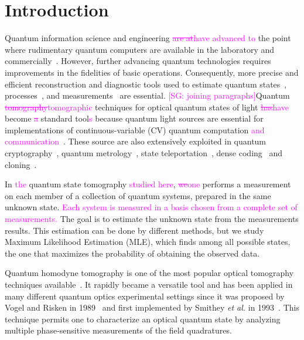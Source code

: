 \documentclass[
reprint,
superscriptaddress,
showpacs,
amsmath,
amssymb,
aps,
pra,
longbibliography
]{revtex4-1}
\providecommand{\aucmnt}[1]{#1}
\providecommand{\editcolor}[2]{\textcolor{#1}{#2}}
\providecommand{\aucmnt}[1]{}
\providecommand{\editcolor}[2]{#2}
\newcommand{\SG}[1]{\editcolor{magenta}{#1}}
\newcommand{\SGs}[1]{\aucmnt{\editcolor{magenta}{\sout{#1}}}}
\newcommand{\SGc}[1]{\aucmnt{\editcolor{magenta}{[SG: #1]}}}
\begin{document}

\section{Introduction}
\label{intro}
Quantum information science and engineering \SGs{are at}\SG{have
  advanced to} the point where rudimentary quantum computers are
available in the laboratory and commercially~\cite{kandala2017,
  Linke2017, Monk2017, Denchev2016}.  However, further advancing
quantum technologies requires improvements in the fidelities of basic
operations.  Consequently, more precise and efficient reconstruction
and diagnostic tools used to estimate quantum states~\cite{Vogel1989,
  Smithey1993, Dunn1995, Banaszek1999, Banaszek2000, White2002,
  Ourjoumtsev2007, Neergaard2006}, processes~\cite{Chuang1997,
  Poyatos1997, Altepeter2003, Dariano1998, Nielsen1998, Mitchell2003,
  Obrien2004,Kupchak2015}, and measurements~\cite{Luis1999,
  Fiurasek2001, Dariano2004, Lundeen2009} are essential.  \SGc{joining
  paragraphs}Quantum \SGs{tomography}\SG{tomographic} techniques for
optical quantum states of light \SGs{has}\SG{have} become \SGs{a}
standard tool\SG{s} because quantum light sources are essential for
implementations of continuous-variable (CV) quantum computation
\SG{and communication}~\cite{Lloyd1999, Gottesman2001, Bartlett2002,
  Jeong2002, Ralph2003}.  These source are also extensively exploited
in quantum cryptography~\cite{Ralph1999, Hillery2000, Silberhorn2002,
  Pirandola2008, Luiz2017}, quantum metrology~\cite{Eberle2010,
  Demkowicz2013}, state teleportation~\cite{Vaidman1994,
  Braunstein1998, He2015}, dense coding~\cite{Braunstein2000, Lee2014}
and cloning~\cite{Cerf2000, Braunstein2001}.

In \SG{the} quantum state tomography \SG{studied here},
\SGs{we}\SG{one} performs a measurement on each member of a collection
of quantum systems, prepared in the same unknown state. \SG{Each
  system is measured in a basis chosen from a complete set of
  measurements.}  The goal is to estimate the unknown state from the
measurements results.  This estimation can be done by different
methods, but we study Maximum Likelihood Estimation (MLE), which finds
among all possible states, the one that maximizes the probability of
obtaining the observed data.

Quantum homodyne tomography is one of the most popular optical
tomography techniques available~\cite{Lvovsky2004}. It rapidly became
a versatile tool and has been applied in many different quantum optics
experimental settings since it was proposed by Vogel and Risken in
1989~\cite{Vogel1989} and first implemented by Smithey \textit{et al.}
in 1993~\cite{Smithey1993}. This technique permits one to characterize
an optical quantum state by analyzing multiple phase-sensitive
measurements of the field quadratures.
\end{document}
